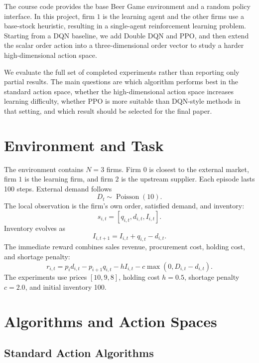 \documentclass[nohyperref]{article}
\begin{document}
The course code provides the base Beer Game environment and a random policy interface. In this project, firm $1$ is the learning agent and the other firms use a base-stock heuristic, resulting in a single-agent reinforcement learning problem. Starting from a DQN baseline, we add Double DQN and PPO, and then extend the scalar order action into a three-dimensional order vector to study a harder high-dimensional action space.

We evaluate the full set of completed experiments rather than reporting only partial results. The main questions are which algorithm performs best in the standard action space, whether the high-dimensional action space increases learning difficulty, whether PPO is more suitable than DQN-style methods in that setting, and which result should be selected for the final paper.

\section{Environment and Task}

The environment contains $N=3$ firms. Firm $0$ is closest to the external market, firm $1$ is the learning firm, and firm $2$ is the upstream supplier. Each episode lasts 100 steps. External demand follows
\begin{equation}
D_t \sim \operatorname{Poisson}(10).
\end{equation}
The local observation is the firm's own order, satisfied demand, and inventory:
\begin{equation}
s_{i,t}=[q_{i,t}, d_{i,t}, I_{i,t}].
\end{equation}
Inventory evolves as
\begin{equation}
I_{i,t+1}=I_{i,t}+q_{i,t}-d_{i,t}.
\end{equation}
The immediate reward combines sales revenue, procurement cost, holding cost, and shortage penalty:
\begin{equation}
r_{i,t}=p_i d_{i,t}-p_{i+1}q_{i,t}-hI_{i,t}-c\max(0,D_{i,t}-d_{i,t}).
\end{equation}
The experiments use prices $[10,9,8]$, holding cost $h=0.5$, shortage penalty $c=2.0$, and initial inventory 100.

\section{Algorithms and Action Spaces}

\subsection{Standard Action Algorithms}
\end{document}
